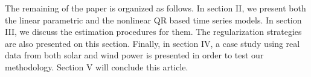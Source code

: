 The remaining of the paper is organized as follows. In section II, we present both the linear parametric and the nonlinear QR based time series models. In section III, we discuss the estimation procedures for them. The regularization strategies are also presented on this section. Finally, in section IV, a case study using real data from both solar and wind power is presented in order to test our methodology. Section V will conclude this article.





% 
%
%	
%


















%
%
%
%
%
%
%
%
%





